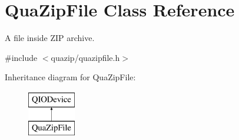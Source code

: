 \hypertarget{class_qua_zip_file}{\section{Qua\-Zip\-File Class Reference}
\label{class_qua_zip_file}
}


A file inside Z\-I\-P archive.  




{\ttfamily \#include $<$quazip/quazipfile.\-h$>$}

Inheritance diagram for Qua\-Zip\-File\-:\begin{figure}[H]
\begin{center}
\leavevmode
\includegraphics[height=2.000000cm]{class_qua_zip_file}
\end{center}
\end{figure}
